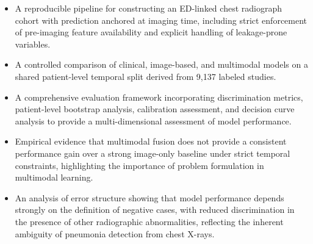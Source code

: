 \begin{itemize}
    \item A reproducible pipeline for constructing an ED-linked chest radiograph cohort with prediction anchored at imaging time, including strict enforcement of pre-imaging feature availability and explicit handling of leakage-prone variables.
    
    \item A controlled comparison of clinical, image-based, and multimodal models on a shared patient-level temporal split derived from 9{,}137 labeled studies.
    
    \item A comprehensive evaluation framework incorporating discrimination metrics, patient-level bootstrap analysis, calibration assessment, and decision curve analysis to provide a multi-dimensional assessment of model performance.
    
    \item Empirical evidence that multimodal fusion does not provide a consistent performance gain over a strong image-only baseline under strict temporal constraints, highlighting the importance of problem formulation in multimodal learning.
    
    \item An analysis of error structure showing that model performance depends strongly on the definition of negative cases, with reduced discrimination in the presence of other radiographic abnormalities, reflecting the inherent ambiguity of pneumonia detection from chest X-rays.
\end{itemize}